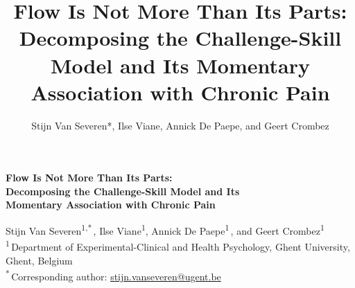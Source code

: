 \documentclass[11pt,a4paper]{article}
\title{Flow Is Not More Than Its Parts: Decomposing the Challenge-Skill Model and Its Momentary Association with Chronic Pain}
\author{Stijn Van Severen*, Ilse Viane, Annick De Paepe, and Geert Crombez}
\date{}
\begin{document}
\begin{titlepage}
\thispagestyle{fancy}
\vspace*{\fill}
\begin{center}
{\fontsize{18.2}{22.8}\selectfont\textbf{Flow Is Not More Than Its Parts:\\
Decomposing the Challenge-Skill Model and Its\\
Momentary Association with Chronic Pain}\par}
\vspace{1.2em}
\normalsize
Stijn Van Severen\textsuperscript{1,*}\,,
Ilse Viane\textsuperscript{1},
Annick De Paepe\textsuperscript{1}\,, and
Geert Crombez\textsuperscript{1}\,\\[0.6em]
\footnotesize
\textsuperscript{1}\,Department of Experimental-Clinical and Health Psychology,
Ghent University, Ghent, Belgium\\
\textsuperscript{*}\,Corresponding author: \href{mailto:stijn.vanseveren@ugent.be}{stijn.vanseveren@ugent.be}
\end{center}
\vspace{0.8em}


\end{titlepage}
\end{document}
